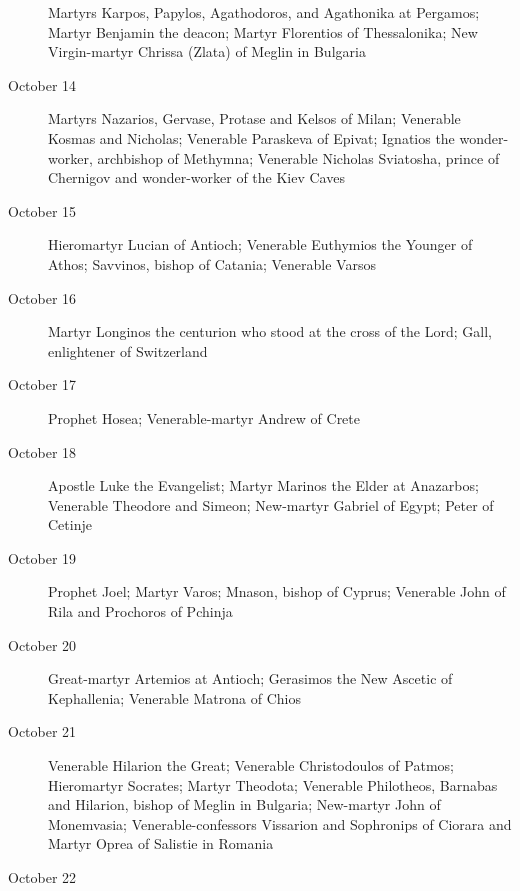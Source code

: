 \begin{description}
Martyrs Karpos, Papylos, Agathodoros, and Agathonika at Pergamos; Martyr Benjamin the deacon; Martyr Florentios of Thessalonika; New Virgin-martyr Chrissa (Zlata) of Meglin in Bulgaria

\item[October 14]

Martyrs Nazarios, Gervase, Protase and Kelsos of Milan; Venerable Kosmas and Nicholas; Venerable Paraskeva of Epivat; Ignatios the wonder-worker, archbishop of Methymna; Venerable Nicholas Sviatosha, prince of Chernigov and wonder-worker of the Kiev Caves

\item[October 15]

Hieromartyr Lucian of Antioch; Venerable Euthymios the Younger of Athos; Savvinos, bishop of Catania; Venerable Varsos

\item[October 16]

Martyr Longinos the centurion who stood at the cross of the Lord; Gall, enlightener of Switzerland

\item[October 17]

Prophet Hosea; Venerable-martyr Andrew of Crete

\item[October 18]

Apostle Luke the Evangelist; Martyr Marinos the Elder at Anazarbos; Venerable Theodore and Simeon; New-martyr Gabriel of Egypt; Peter of Cetinje

\item[October 19]

Prophet Joel; Martyr Varos; Mnason, bishop of Cyprus; Venerable John of Rila and Prochoros of Pchinja

\item[October 20]

Great-martyr Artemios at Antioch; Gerasimos the New Ascetic of Kephallenia; Venerable Matrona of Chios

\item[October 21]

Venerable Hilarion the Great; Venerable Christodoulos of Patmos; Hieromartyr Socrates; Martyr Theodota; Venerable Philotheos, Barnabas and Hilarion, bishop of Meglin in Bulgaria; New-martyr John of Monemvasia; Venerable-confessors Vissarion and Sophronips of Ciorara and Martyr Oprea of Salistie in Romania

\item[October 22]


\end{description}
